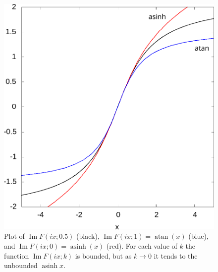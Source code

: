 \documentclass{article}
\numberwithin{equation}{section}
\numberwithin{figure}{section}
\DeclareMathOperator{\atan}{atan}
\DeclareMathOperator{\asinh}{asinh}
\DeclareMathOperator{\Imag}{Im}
\newcommand{\iu}{i}
\begin{document}
\begin{figure}
\includegraphics[height=0.3\textheight]{graphics/elliptic_bounds_F0.png}
\caption{Plot of $\Imag F(\iu x;0.5)$ (black), $\Imag F(\iu x;1) = \atan(x)$ (blue), and $\Imag F(\iu x;0)=\asinh(x)$ (red). For each value of $k$ the function $\Imag F(\iu x;k)$ is bounded, but as $k\to 0$ it tends to the unbounded $\asinh x$.}
\end{figure}
\end{document}
